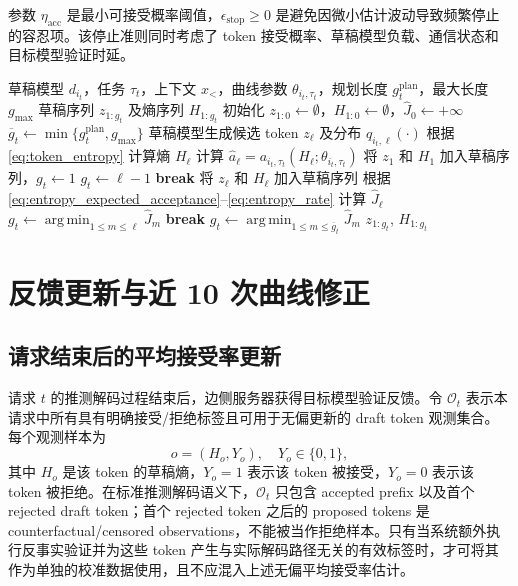 \documentclass[11pt,a4paper]{ctexart}
\newcommand{\argmin}{\operatorname*{arg\,min}}
\begin{document}
参数 $\eta_{\mathrm{acc}}$ 是最小可接受概率阈值，$\epsilon_{\mathrm{stop}}\geq 0$ 是避免因微小估计波动导致频繁停止的容忍项。该停止准则同时考虑了 token 接受概率、草稿模型负载、通信状态和目标模型验证时延。

\begin{algorithm}[t]
\caption{熵感知动态起草}
\label{alg:entropy_drafting}
\begin{algorithmic}[1]
\Require 草稿模型 $d_{i_t}$，任务 $\tau_t$，上下文 $x_{<}$，曲线参数 $\theta_{i_t,\tau_t}$，规划长度 $g_t^{\mathrm{plan}}$，最大长度 $g_{\max}$
\Ensure 草稿序列 $z_{1:g_t}$ 及熵序列 $H_{1:g_t}$
\State 初始化 $z_{1:0}\gets\emptyset$，$H_{1:0}\gets\emptyset$，$\widehat{J}_0\gets+\infty$
\State $\overline{g}_t\gets\min\{g_t^{\mathrm{plan}},g_{\max}\}$
    \State 草稿模型生成候选 token $z_\ell$ 及分布 $q_{i_t,\ell}(\cdot)$
    \State 根据 \cref{eq:token_entropy} 计算熵 $H_\ell$
    \State 计算 $\widehat{a}_\ell=a_{i_t,\tau_t}(H_\ell;\theta_{i_t,\tau_t})$
            \State 将 $z_1$ 和 $H_1$ 加入草稿序列，$g_t\gets 1$
        \Else
            \State $g_t\gets \ell-1$
        \EndIf
        \State \textbf{break}
    \EndIf
    \State 将 $z_\ell$ 和 $H_\ell$ 加入草稿序列
    \State 根据 \cref{eq:entropy_expected_acceptance}--\cref{eq:entropy_rate} 计算 $\widehat{J}_\ell$
        \State $g_t\gets\argmin_{1\leq m\leq\ell}\widehat{J}_m$
        \State \textbf{break}
    \EndIf
        \State $g_t\gets\argmin_{1\leq m\leq \overline{g}_t}\widehat{J}_m$
    \EndIf
\EndFor
\State \Return $z_{1:g_t}$, $H_{1:g_t}$
\end{algorithmic}
\end{algorithm}

\section{反馈更新与近 10 次曲线修正}
\label{sec:update}

\subsection{请求结束后的平均接受率更新}
\label{subsec:mean_update}

请求 $t$ 的推测解码过程结束后，边侧服务器获得目标模型验证反馈。令 $\mathcal{O}_t$ 表示本请求中所有具有明确接受/拒绝标签且可用于无偏更新的 draft token 观测集合。每个观测样本为
\begin{equation}
    o=(H_o,Y_o),
    \quad
    Y_o\in\{0,1\},
\end{equation}
其中 $H_o$ 是该 token 的草稿熵，$Y_o=1$ 表示该 token 被接受，$Y_o=0$ 表示该 token 被拒绝。在标准推测解码语义下，$\mathcal{O}_t$ 只包含 accepted prefix 以及首个 rejected draft token；首个 rejected token 之后的 proposed tokens 是 counterfactual/censored observations，不能被当作拒绝样本。只有当系统额外执行反事实验证并为这些 token 产生与实际解码路径无关的有效标签时，才可将其作为单独的校准数据使用，且不应混入上述无偏平均接受率估计。
\end{document}

